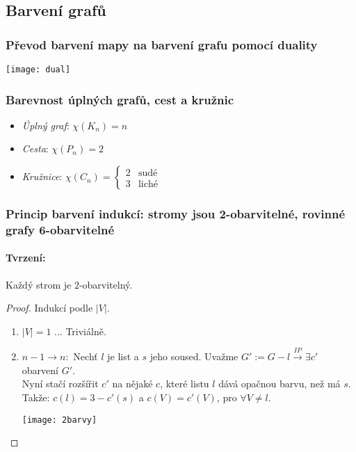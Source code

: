 \documentclass[10pt,a4paper]{article}
\begin{document}
\subsection{Barvení grafů}

\subsubsection{Převod barvení mapy na barvení grafu pomocí duality}

\begin{center}
    \texttt{[image: dual]}    
\end{center}

\subsubsection{Barevnost úplných grafů, cest a kružnic}

\begin{itemize}
    \item \textit{Úplný graf}: $\chi (K_n) = n$
    \item \textit{Cesta}: $\chi (P_n) = 2$
    \item \textit{Kružnice}: $\chi (C_n) = \begin{cases}
        2 &\text{sudé}\\
        3 &\text{liché}
    \end{cases}$
\end{itemize}

\subsubsection{Princip barvení indukcí: stromy jsou 2-obarvitelné, rovinné grafy 6-obarvitelné}

\paragraph*{Tvrzení: } Každý strom je $2$-obarvitelný.

\begin{proof} Indukcí podle $|V|$.
    
    \begin{enumerate}[label=(\roman*)]
        \item $|V| = 1$ ... Triviálně.
        \item $n-1\to n:$ Nechť $l$ je list a $s$ jeho soused. Uvažme $G':=G-l \xrightarrow{IP} \exists c'$ obarvení $G'$.\\
        Nyní stačí rozšířit $c'$ na nějaké $c$, které listu $l$ dává opačnou barvu, než má $s$. Takže: $c(l) = 3-c'(s)$ a $c(V) = c'(V)$, pro $\forall V\neq l$.
        
        \texttt{[image: 2barvy]}
    \end{enumerate}
    
\end{proof}
\end{document}
